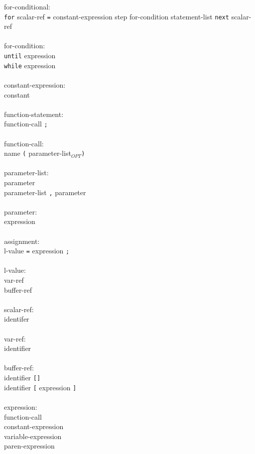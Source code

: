 \documentclass[12pt]{article}
\newcommand{\kw}[1]{{\tt #1}}
\newcommand{\opt}{$_{OPT}$}
\begin{document}
\begin{tabbing}
for-conditional:\\
\> \kw{for} scalar-ref \kw{=} constant-expression step for-condition statement-list \kw{next} scalar-ref\\
\\
for-condition:\\
\> \kw{until} expression\\
\> \kw{while} expression\\
\\
constant-expression:\\
\> constant\\
\\
function-statement:\\
\> function-call \kw{;}\\
\\
function-call:\\
\> name \kw{(} parameter-list\opt \kw{)}\\
\\
parameter-list:\\
\> parameter\\
\> parameter-list \kw{,} parameter\\
\\
parameter:\\
\> expression\\
\\
assignment:\\
\> l-value \kw{=} expression \kw{;} \\
\\
l-value:\\
\> var-ref\\
\> buffer-ref\\
\\
scalar-ref:\\
\> identifer\\
\\
var-ref:\\
\> identifier\\
\\
buffer-ref:\\
\> identifier \kw{[]}\\
\> identifier \kw{[} expression \kw{]}\\
\\
expression:\\
\> function-call\\
\> constant-expression\\
\> variable-expression\\
\> paren-expression\\

\end{tabbing}
\end{document}
